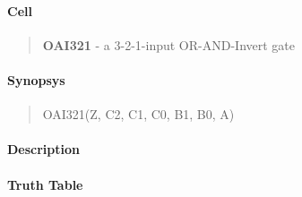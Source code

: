 \label{OAI321}
\paragraph{Cell}
\begin{quote}
    \textbf{OAI321} - a 3-2-1-input OR-AND-Invert gate
\end{quote}

\paragraph{Synopsys}
\begin{quote}
    OAI321(Z, C2, C1, C0, B1, B0, A)
\end{quote}

\paragraph{Description}

%

\paragraph{Truth Table}


